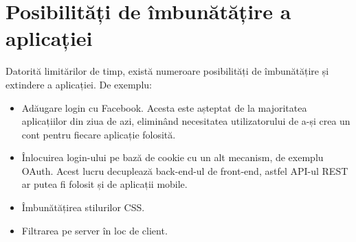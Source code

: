 \section{Posibilități de îmbunătățire a aplicației}

Datorită limitărilor de timp, există numeroare posibilități de 
îmbunătățire și extindere a aplicației. De exemplu:
\begin{itemize}
\item Adăugare login cu Facebook. Acesta este așteptat de la
majoritatea aplicațiilor din ziua de azi, eliminând necesitatea
utilizatorului de a-și crea un cont pentru fiecare aplicație folosită.
\item Înlocuirea login-ului pe bază de cookie cu un alt mecanism,
de exemplu OAuth. Acest lucru decuplează back-end-ul de front-end, 
astfel API-ul REST ar putea fi folosit
și de aplicații mobile.
\item Îmbunătățirea stilurilor CSS.
\item Filtrarea pe server în loc de client.
\end{itemize}
